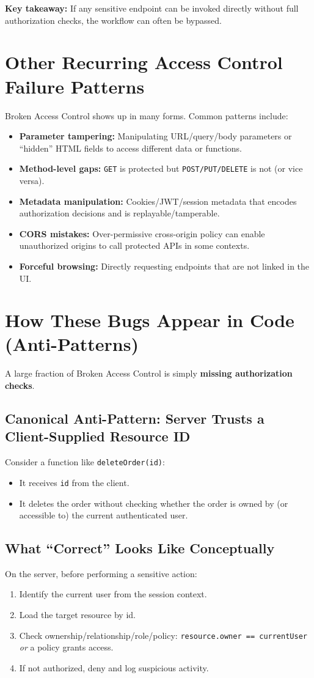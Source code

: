 \documentclass[11pt]{article}
\newcommand{\KeyTakeaway}[1]{%
  \vspace{0.5em}
  \noindent\textbf{Key takeaway:} #1
  \vspace{0.5em}
}
\begin{document}
\KeyTakeaway{If any sensitive endpoint can be invoked directly without full authorization checks, the workflow can often be bypassed.}

\section{Other Recurring Access Control Failure Patterns}
Broken Access Control shows up in many forms. Common patterns include:
\begin{itemize}
  \item \textbf{Parameter tampering:} Manipulating URL/query/body parameters or ``hidden'' HTML fields to access different data or functions.
  \item \textbf{Method-level gaps:} \texttt{GET} is protected but \texttt{POST/PUT/DELETE} is not (or vice versa).
  \item \textbf{Metadata manipulation:} Cookies/JWT/session metadata that encodes authorization decisions and is replayable/tamperable.
  \item \textbf{CORS mistakes:} Over-permissive cross-origin policy can enable unauthorized origins to call protected APIs in some contexts.
  \item \textbf{Forceful browsing:} Directly requesting endpoints that are not linked in the UI.
\end{itemize}

\section{How These Bugs Appear in Code (Anti-Patterns)}
A large fraction of Broken Access Control is simply \textbf{missing authorization checks}.

\subsection{Canonical Anti-Pattern: Server Trusts a Client-Supplied Resource ID}
Consider a function like \texttt{deleteOrder(id)}:
\begin{itemize}
  \item It receives \texttt{id} from the client.
  \item It deletes the order without checking whether the order is owned by (or accessible to) the current authenticated user.
\end{itemize}

\subsection{What ``Correct'' Looks Like Conceptually}
On the server, before performing a sensitive action:
\begin{enumerate}
  \item Identify the current user from the session context.
  \item Load the target resource by id.
  \item Check ownership/relationship/role/policy: \texttt{resource.owner == currentUser} \emph{or} a policy grants access.
  \item If not authorized, deny and log suspicious activity.
\end{enumerate}
\end{document}
